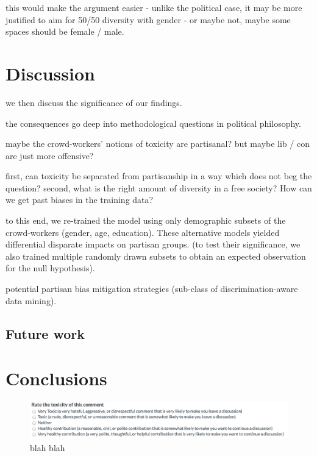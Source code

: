 \documentclass[sigconf]{acmart}
\begin{document}
this would make the argument easier - unlike the political case, it may be more justified to aim for 50/50 diversity with gender - or maybe not, maybe some spaces should be female / male.

\section{Discussion}

we then discuss the significance of our findings.

the consequences go deep into methodological questions in political philosophy.

maybe the crowd-workers’ notions of toxicity are partisanal?
but maybe lib / con are just more offensive?

first, can toxicity be separated from partisanship in a way which does not beg the question?
second, what is the right amount of diversity in a free society?
How can we get past biases in the training data?

to this end, we re-trained the model using only demographic subsets of the crowd-workers (gender, age, education). These alternative models yielded differential disparate impacts on partisan groups. (to test their significance, we also trained multiple randomly drawn subsets to obtain an expected observation for the null hypothesis).

potential partisan bias mitigation strategies (sub-class of discrimination-aware data mining).

\subsection{Future work}

\section{Conclusions}

\begin{figure}[h!]
\begin{center}
\includegraphics[width=\columnwidth]{figures/toxicity_question.png}
\caption{blah blah}\label{fig:method}
\end{center}
\end{figure}





\medskip
\end{document}

